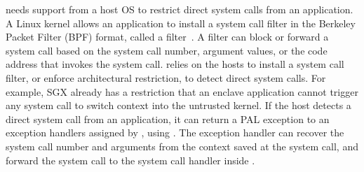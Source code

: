 \thelibos{} needs support from a host OS to restrict direct system calls from an application.
A Linux kernel allows an application to install a system call filter in the Berkeley Packet Filter (BPF) format,
called a \seccomp{} filter~\cite{seccomp}.
A \seccomp{} filter can block or forward a system call based on the system call number,
argument values, or the code address that invokes the system call.
\graphene{} relies on the hosts to install a system call filter, or enforce architectural restriction, to detect direct system calls.
For example, SGX already has a restriction that an enclave application cannot trigger any system call to switch context into the untrusted kernel.
If the host detects a direct system call from an application,
it can return
a PAL exception to an exception handlers assigned by \thelibos{}, using  .
The exception handler can recover the system call number and arguments
from the context saved at the system call,
and forward the system call to the system call handler
inside \thelibos{}.


